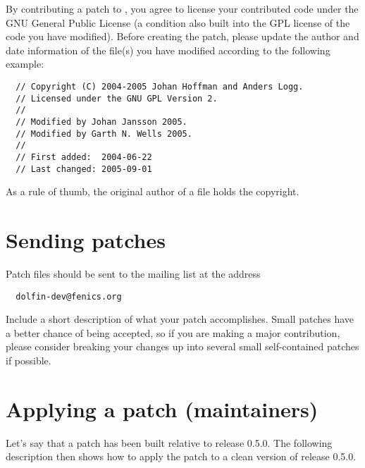 By contributing a patch to \dolfin{}, you agree to license your
contributed code under the GNU General Public License (a condition
also built into the GPL license of the code you have modified). Before
creating the patch, please update the author and date information of
the file(s) you have modified according to the following example:

\begin{verbatim}
  // Copyright (C) 2004-2005 Johan Hoffman and Anders Logg.
  // Licensed under the GNU GPL Version 2.
  //
  // Modified by Johan Jansson 2005.
  // Modified by Garth N. Wells 2005.
  //
  // First added:  2004-06-22
  // Last changed: 2005-09-01
\end{verbatim}

As a rule of thumb, the original author of a file holds the copyright.

\section{Sending patches}

Patch files should be sent to the \dolfin{} mailing list at the address
\begin{verbatim}
  dolfin-dev@fenics.org
\end{verbatim}
Include a short description of what your patch accomplishes. Small
patches have a better chance of being accepted, so if you are making a
major contribution, please consider breaking your changes up into
several small self-contained patches if possible.

\section{Applying a patch (maintainers)}

Let's say that a patch has been built relative to \dolfin{} release 0.5.0.
The following description then shows how to apply the patch to a clean
version of release 0.5.0.

